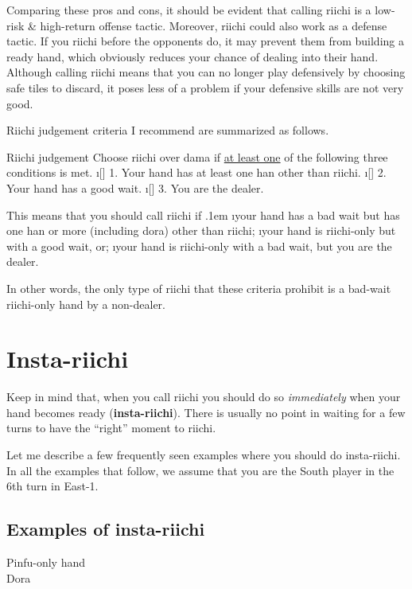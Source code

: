 \bigskip
Comparing these pros and cons, it should be evident that calling riichi is a low-risk \& high-return offense tactic. 
Moreover, riichi could also work as a defense tactic. If you riichi before the opponents do, it may prevent them from building a ready hand, which obviously reduces your chance of dealing into their hand. 
Although calling riichi means that you can no longer play defensively by choosing safe tiles to discard, it poses less of a problem if your defensive skills are not very good. 

\bigskip

Riichi judgement criteria I recommend are summarized as follows. 

\bigskip
\begin{itembox}[c]{Riichi judgement}
Choose riichi over {\jap dama} if \underline{\large at least one} of the following three conditions is met. 
\bi
\i[] 1. Your hand has at least one {\jap han} other than riichi.
\i[] 2. Your hand has a good wait.
\i[] 3. You are the dealer.
\ei \vsps
\end{itembox}

\bigskip
This means that you should call riichi if 
\bi \itemsep.1em
\i your hand has a bad wait but has one {\jap han} or more (including {\jap dora}) other than riichi;
\i your hand is riichi-only but with a good wait, or;
\i your hand is riichi-only with a bad wait, but you are the dealer. 
\ei

In other words, the only type of riichi that these criteria prohibit is a bad-wait riichi-only hand by a non-dealer. 

\newpage
\section{Insta-riichi} 	
Keep in mind that, when you call riichi you should do so \emph{immediately} when your hand becomes ready ({\bf insta-riichi}). There is usually no point in waiting for a few turns to have the ``right'' moment to riichi. 

\bigskip
Let me describe a few frequently seen examples where you should do insta-riichi. 
In all the examples that follow, we assume that you are the South player in the 6th turn in East-1. 

\bigskip
\subsection{Examples of insta-riichi}

\begin{itembox}[r]{{\jap Pinfu}-only hand}
\bp
{}~~\bei\\
\hfill\footnotesize{{\jap Dora}~~~~~}
\ep {}
\vspace{-15pt}
\end{itembox}

